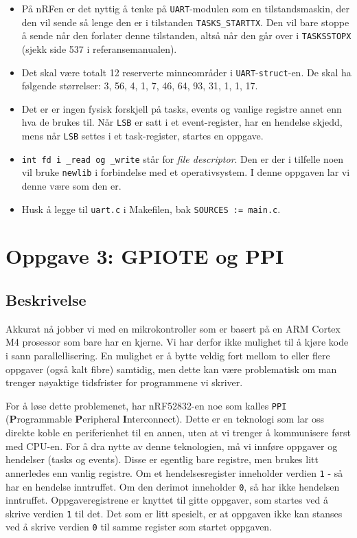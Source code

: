 \begin{itemize}
    \item På nRFen er det nyttig å tenke på \verb|UART|-modulen som en tilstandsmaskin, der den vil sende så lenge den er i tilstanden \verb|TASKS_STARTTX|. Den vil bare stoppe å sende når den forlater denne tilstanden, altså når den går over i \verb|TASKSSTOPX| (sjekk side 537 i referansemanualen).
    \item Det skal være totalt 12 reserverte minneområder i \verb|UART|-\verb|struct|-en. De skal ha følgende størrelser: 3, 56, 4, 1, 7, 46, 64, 93, 31, 1, 1, 17.
    \item Det er er ingen fysisk forskjell på tasks, events og vanlige registre annet enn hva de brukes til. Når \verb|LSB| er satt i et event-register, har en hendelse skjedd, mens når \verb|LSB| settes i et task-register, startes en oppgave.
    \item \lstinline{int fd i _read og _write} står for \textit{file descriptor}. Den er der i tilfelle noen vil bruke \verb|newlib| i forbindelse med et operativsystem. I denne oppgaven lar vi denne være som den er.
    \item Husk å legge til \verb|uart.c| i Makefilen, bak \verb|SOURCES := main.c|.
\end{itemize}






\section{Oppgave 3: GPIOTE og PPI}
\subsection{Beskrivelse}


Akkurat nå jobber vi med en mikrokontroller som er basert på en ARM Cortex M4 prosessor som bare har en kjerne. Vi har derfor ikke mulighet til å kjøre kode i sann parallellisering. En mulighet er å bytte veldig fort mellom to eller flere oppgaver (også kalt fibre) samtidig, men dette kan være problematisk om man trenger nøyaktige tidsfrister for programmene vi skriver.

For å løse dette problemenet, har nRF52832-en noe som kalles \verb|PPI| (\textbf{P}rogrammable \textbf{P}eripheral \textbf{I}nterconnect). Dette er en teknologi som lar oss direkte koble en periferienhet til en annen, uten at vi trenger å kommunisere først med CPU-en. For å dra nytte av denne teknologien, må vi innføre oppgaver og hendelser (tasks og events). Disse er egentlig bare registre, men brukes litt annerledes enn vanlig registre. Om et hendelsesregister inneholder verdien \verb|1| - så har en hendelse inntruffet. Om den derimot inneholder \verb|0|, så har ikke hendelsen inntruffet. Oppgaveregistrene er knyttet til gitte oppgaver, som startes ved å skrive verdien \verb|1| til det. Det som er litt spesielt, er at oppgaven ikke kan stanses ved å skrive verdien \verb|0| til samme register som startet oppgaven.

